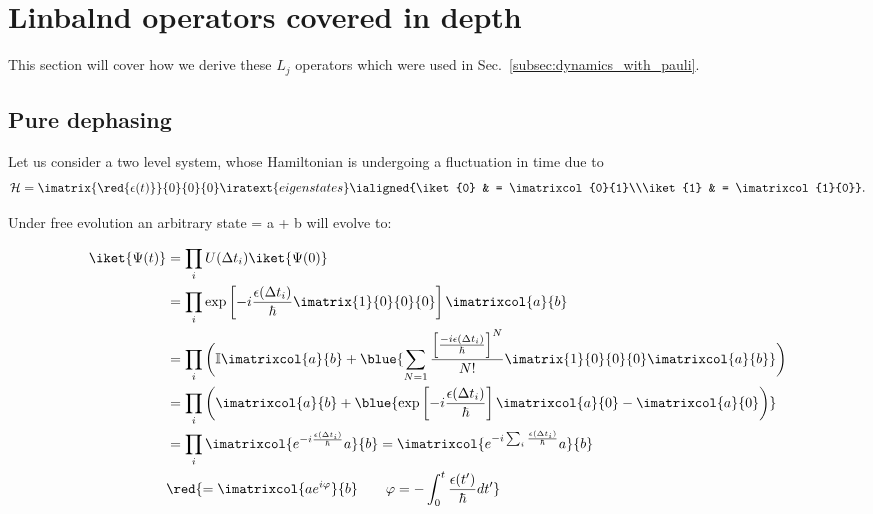 \section{Linbalnd operators covered in depth\label{sec:linbland2}}
This section will cover how we derive these $ L_j $ operators which were used in Sec.~\ref{subsec:dynamics_with_pauli}.
 \subsection{Pure dephasing\label{sec:lin_1}}
  Let us consider a two level system, whose Hamiltonian is undergoing a fluctuation in time due to 
  \begin{equation}\label{key}
  	\mathcal{H} = \imatrix{\red{\epsilon(t)}}{0}{0}{0} \iratext{eigenstates} \ialigned{\iket{0} & = \imatrixcol{0}{1}\\\iket{1} & = \imatrixcol{1}{0}}.
  \end{equation}
  
  \noindent Under free evolution an arbitrary state  = a + b will evolve to:
  
  \begin{equation}\label{key}
  	\begin{aligned}
  	\iket{\Psi(t)} & = \prod_i U(\Delta t_i) \iket{\Psi(0)} \\
  	& = \prod_i \exp\left[-i\frac{\epsilon(\Delta t_i)}{\hbar} \imatrix{1}{0}{0}{0}\right]\imatrixcol{a}{b}\\
  	& = \prod_i \bigg(\mathbb{I}\imatrixcol{a}{b} + \blue{\sum_{{N = 1}}\frac{\left[\frac{-i\epsilon(\Delta t_i)}{\hbar}\right]^N}{N!} \imatrix{1}{0}{0}{0}\imatrixcol{a}{b}}\bigg)\\
  	& = \prod_i \bigg(\imatrixcol{a}{b} + \blue{\exp\left[-i\frac{\epsilon(\Delta t_i)}{\hbar}\right]\imatrixcol{a}{0} - \imatrixcol{a}{0}\bigg)}\\
  	& = \prod_i \imatrixcol{e^{-i\frac{\epsilon(\Delta t_i)}{\hbar}}a}{b} = \imatrixcol{e^{-i\sum_i\frac{\epsilon(\Delta t_i)}{\hbar}}a}{b} \\
  	& \red{= \imatrixcol{ae^{i\varphi}}{b} \qquad \varphi = -\int_{0}^{t}\frac{\epsilon(t')}{\hbar}dt'}
  	\end{aligned}
  \end{equation}
 
 

